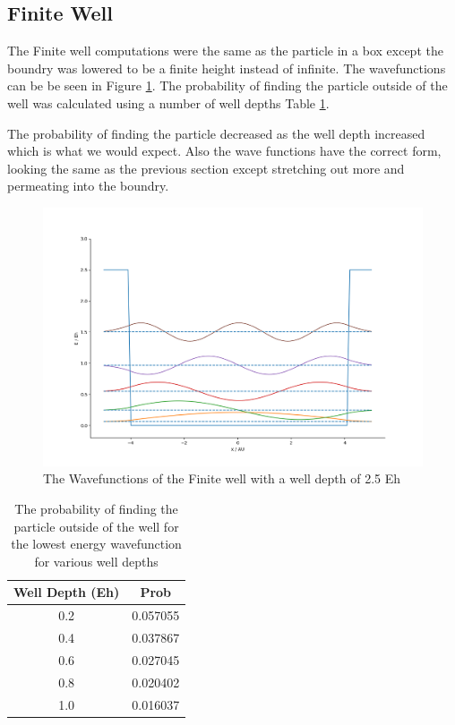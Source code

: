 \documentclass{article}
\begin{document}
\newpage
\subsection*{Finite Well}
The Finite well computations were the same as the particle in a box except the boundry was lowered to be a finite height instead of infinite. The wavefunctions can be be seen in Figure \ref{fig:fin}. The probability of finding the particle outside of the well was calculated using a number of well depths Table \ref{tab:fin}.

The probability of finding the particle decreased as the well depth increased which is what we would expect. Also the wave functions have the correct form, looking the same as the previous section except stretching out more and permeating into the boundry.

\begin{figure}[h]
\centering
	\includegraphics[width=.75\linewidth]{images/finite.png}
	\caption{The Wavefunctions of the Finite well with a well depth of 2.5 Eh }
	\label{fig:fin}
\end{figure}

\begin{table}[h]
\centering
\begin{tabular}{ |c|c|}
\hline
Well Depth (Eh) & Prob\\
\hline
0.2 & 0.057055\\
0.4 & 0.037867 \\
0.6 & 0.027045 \\
0.8 & 0.020402\\
1.0 & 0.016037\\
\hline
\end{tabular}
\caption{The probability of finding the particle outside of the well for the lowest energy wavefunction for various well depths}
\label{tab:fin}
\end{table}   
\end{document}
